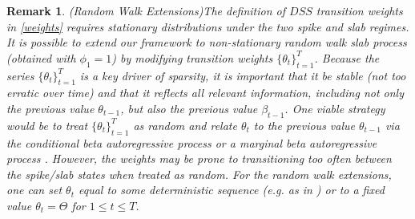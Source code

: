 \documentclass[ba]{imsart}
\numberwithin{equation}{section}
\theoremstyle{plain}
\newtheorem{remark}{Remark}
\begin{document}
{
\begin{remark}(Random Walk Extensions)\label{remark:nonstat}
The definition of $DSS$ transition weights in \eqref{weights} requires stationary distributions under the two spike and slab regimes.
It is possible to extend our framework to non-stationary  random walk slab process (obtained with $\phi_1=1$)   by modifying  transition weights $\{\theta_{t}\}_{t=1}^T$. 
 Because the series $\{\theta_{t}\}_{t=1}^T$ is a key driver of  sparsity, it is important that it be stable (not too erratic over time) and that it reflects all relevant information, including not only the previous value  $\theta_{t-1}$, but also the previous value $\beta_{t-1}$.  One viable strategy  would be to treat $\{\theta_t\}_{t=1}^T$ as random  and relate $\theta_t$ to the previous value $\theta_{t-1}$ via the conditional beta autoregressive process  \citep{casarin,casarin2} or a marginal beta autoregressive process  \citep{beta_marginal}. However,  the weights may be prone to  transitioning too often between the spike/slab states when treated as random.
For the random walk extensions, one can set $\theta_{t}$  equal to some deterministic sequence  (e.g. as in \cite{Nakajima2010})  or  to a fixed value $\theta_t=\Theta$ for $1\leq t\leq T$. 
\end{remark}}
\end{document}
